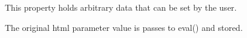 \documentclass[letterpaper,10pt,english]{sphinxmanual}
\begin{document}
\begin{fulllineitems}
\begin{fulllineitems}
\begin{quote}
\begin{description}
\end{description}
\end{quote}

\end{fulllineitems}


\begin{fulllineitems}
\label{api:controls.Plot2D.user}
This property holds arbitrary data that can be set by the user.

The original html parameter value is passes to eval() and stored.

\end{fulllineitems}


\end{fulllineitems}

\end{document}
